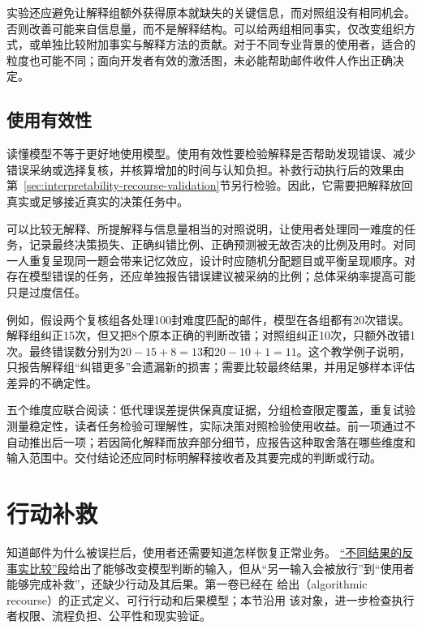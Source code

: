 实验还应避免让解释组额外获得原本就缺失的关键信息，而对照组没有相同机会。否则改善可能来自信息量，而不是解释结构。可以给两组相同事实，仅改变组织方式，或单独比较附加事实与解释方法的贡献。对于不同专业背景的使用者，适合的粒度也可能不同；面向开发者有效的激活图，未必能帮助邮件收件人作出正确决定。

\subsection{使用有效性}
\label{sec:interpretability-quality-utility}

读懂模型不等于更好地使用模型。使用有效性要检验解释是否帮助发现错误、减少错误采纳或选择复核，并核算增加的时间与认知负担。补救行动执行后的效果由第~\ref{sec:interpretability-recourse-validation}节另行检验。因此，它需要把解释放回真实或足够接近真实的决策任务中。

可以比较无解释、所提解释与信息量相当的对照说明，让使用者处理同一难度的任务，记录最终决策损失、正确纠错比例、正确预测被无故否决的比例及用时。对同一人重复呈现同一题会带来记忆效应，设计时应随机分配题目或平衡呈现顺序。对存在模型错误的任务，还应单独报告错误建议被采纳的比例；总体采纳率提高可能只是过度信任。

例如，假设两个复核组各处理100封难度匹配的邮件，模型在各组都有20次错误。解释组纠正15次，但又把8个原本正确的判断改错；对照组纠正10次，只额外改错1次。最终错误数分别为$20-15+8=13$和$20-10+1=11$。这个教学例子说明，只报告解释组“纠错更多”会遗漏新的损害；需要比较最终结果，并用足够样本评估差异的不确定性。

五个维度应联合阅读：低代理误差提供保真度证据，分组检查限定覆盖，重复试验测量稳定性，读者任务检验可理解性，实际决策对照检验使用收益。前一项通过不自动推出后一项；若因简化解释而放弃部分细节，应报告这种取舍落在哪些维度和输入范围中。交付结论还应同时标明解释接收者及其要完成的判断或行动。

\section{行动补救}
\label{sec:interpretability-recourse}

知道邮件为什么被误拦后，使用者还需要知道怎样恢复正常业务。
\hyperref[sec:interpretability-local-counterfactual]{“不同结果的反事实比较”段}给出了能够改变模型判断的输入，但从“另一输入会被放行”到“使用者能够完成补救”，还缺少行动及其后果。第一卷已经在
给出（algorithmic recourse）的正式定义、可行行动和后果模型；本节沿用
该对象，进一步检查执行者权限、流程负担、公平性和现实验证。

